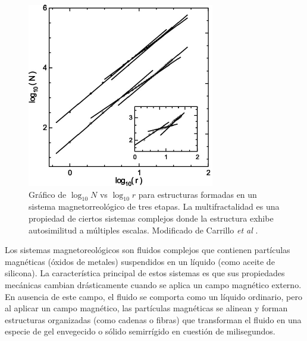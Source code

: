 \begin{figure}[H]
	\begin{center}
		\includegraphics[width=0.4\linewidth]{graphs/Carrillo2003}
		\caption{Gr\'{a}fico de $\log_{10}N$ vs $\log_{10}r$ para estructuras formadas en un sistema magnetorreol\'{o}gico de tres etapas. La multifractalidad es una propiedad de ciertos sistemas complejos donde la estructura exhibe autosimilitud a m\'{u}ltiples  escalas. Modificado de Carrillo \textit{et al} \cite{Carrillo2003}.}
		\label{fig:Carrillo-Fractal}
	\end{center}
\end{figure}

Los sistemas magnetoreol\'{o}gicos son fluidos complejos que contienen part\'{i}culas magn\'{e}ticas (\'{o}xidos de metales) suspendidos en un l\'{i}quido (como aceite de silicona). La caracter\'{i}stica principal de estos sistemas es que sus propiedades mec\'{a}nicas cambian dr\'{a}sticamente cuando se aplica un campo magn\'{e}tico externo. En ausencia de este campo, el ﬂuido se comporta como un l\'{i}quido ordinario, pero al aplicar un campo magn\'{e}tico, las part\'{i}culas magn\'{e}ticas se alinean y forman estructuras organizadas (como cadenas o ﬁbras) que transforman el ﬂuido en una especie de gel envegecido o s\'{o}lido semirr\'{i}gido en cuesti\'{o}n de milisegundos. 

 
